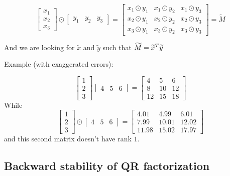 \documentclass[computational_mathematics.tex]{subfiles}
\begin{document}
\[
\begin{bmatrix}
    x_1\\ x_2\\ x_3
\end{bmatrix} \odot
\begin{bmatrix}
    y_1 & y_2 & y_3
\end{bmatrix}
=
\begin{bmatrix}
    x_1 \odot y_1 & x_1  \odot y_2 & x_1  \odot y_3\\
    x_2  \odot y_1 & x_2  \odot y_2 & x_2  \odot y_3\\
    x_3  \odot y_1 & x_3  \odot y_2 & x_3  \odot y_3
\end{bmatrix}
=
\widetilde{M}
\]

And we are looking for $\widetilde{x}$ and $\widetilde{y}$ such that $\widetilde{M} = {\widetilde{x}}^{T} \widetilde{y}$
\begin{example}
Example (with exaggerated errors):

\[
\begin{bmatrix}
    1\\2\\3
\end{bmatrix}
\begin{bmatrix}
    4&5&6
\end{bmatrix}
=
\begin{bmatrix}
    4 & 5 & 6\\
    8 & 10 & 12\\
    12 & 15 & 18
\end{bmatrix}
\]
While
  \[
\begin{bmatrix}
    1\\2\\3
\end{bmatrix} \odot
\begin{bmatrix}
    4&5&6
\end{bmatrix}
=
\begin{bmatrix}
    4.01 & 4.99 & 6.01\\
    7.99 & 10.01 & 12.02\\
    11.98 & 15.02 & 17.97
\end{bmatrix}
\]
and this second matrix doesn't have rank $1$.
\end{example}

\subsection{Backward stability of QR factorization}
\end{document}
